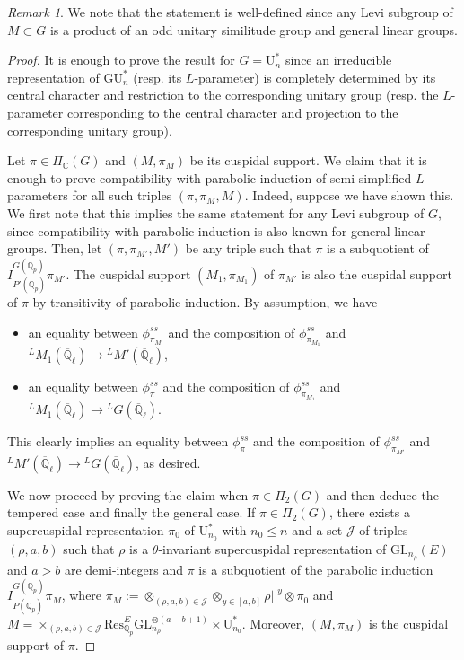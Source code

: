 \documentclass[reqno,11pt]{amsart}
\theoremstyle{remark}
\newtheorem{remark}[theorem]{Remark}
\newcommand{\GU}{\mathrm{GU}}
\newcommand{\U}{\mathrm{U}}
\newcommand{\C}{\mathbb{C}}
\newcommand{\Res}{\mathrm{Res}}
\newcommand{\GL}{\mathrm{GL}}
\newcommand{\Q}{\mathbb{Q}}
\newcommand{\ov}{\overline}
\begin{document}
\begin{remark}
We note that the statement is well-defined since any Levi subgroup of $M \subset G$ is a product of an odd unitary similitude group and general linear groups. 
\end{remark}

\begin{proof}
It is enough to prove the result for $G=\U^*_n$ since an irreducible representation of $\GU^*_n$ (resp. its $L$-parameter) is completely determined by its central character and  restriction to the corresponding unitary group (resp. the $L$-parameter corresponding to the central character and projection to the corresponding unitary group). 

Let $\pi \in \Pi_{\C}(G)$ and $(M, \pi_M)$ be its cuspidal support. We claim that it is enough to prove compatibility with parabolic induction of semi-simplified $L$-parameters for all such triples $(\pi, \pi_M, M)$. Indeed, suppose we have shown this. We first note that this implies the same statement for any Levi subgroup of $G$, since compatibility with parabolic induction is also known for general linear groups. Then, let $(\pi, \pi_{M'}, M')$ be any triple such that $\pi$ is a subquotient of $I_{P'(\mathbb{Q}_{p})}^{G(\mathbb{Q}_{p})}  \pi_{M'}$. The cuspidal support $(M_1, \pi_{M_1})$ of $\pi_{M'}$ is also the cuspidal support of $\pi$ by transitivity of parabolic induction. By assumption, we have 
\begin{itemize}
    \item an equality between $\phi^{ss}_{\pi_{M'}}$ and the composition of $\phi^{ss}_{\pi_{M_1}}$ and ${}^LM_1(\ov{\Q}_{\ell}) \to {}^LM'(\ov{\Q}_{\ell})$,
    \item an equality between $\phi^{ss}_{\pi}$ and the composition of $\phi^{ss}_{\pi_{M_1}}$ and ${}^LM_1(\ov{\Q}_{\ell}) \to {}^LG(\ov{\Q}_{\ell})$.
\end{itemize}
This clearly implies an equality between $\phi^{ss}_{\pi}$ and the composition of $\phi^{ss}_{\pi_{M'}}$ and ${}^LM'(\ov{\Q}_{\ell}) \to {}^LG(\ov{\Q}_{\ell})$, as desired.

We now proceed by proving the claim when $\pi \in \Pi_2(G)$ and then deduce the tempered case and finally the general case. If $\pi \in \Pi_2(G)$, there exists a supercuspidal representation $\pi_0$ of $\U^*_{n_0}$ with $n_0 \leq n$ and a set $\mathcal{J}$ of triples $(\rho, a, b)$ such that $\rho$ is a $\theta$-invariant supercuspidal representation of $\GL_{n_{\rho}}(E)$ and $a > b$ are demi-integers and $\pi$ is a subquotient of the parabolic induction $I_{P(\mathbb{Q}_{p})}^{G(\mathbb{Q}_{p})}\pi_M$,
where $ \pi_M := \otimes_{(\rho, a, b) \in \mathcal{J}} \otimes_{y \in [a, b]} \rho ||^y \otimes \pi_{0}$ and $M = \times_{(\rho, a, b) \in \mathcal{J}} \Res^E_{\mathbb{Q}_{p}} \GL^{\otimes(a-b+1)}_{n_{\rho}} \times \U^*_{n_0} $. Moreover, $(M, \pi_M)$ is the cuspidal support of $\pi$. 


\end{proof}
\end{document}

